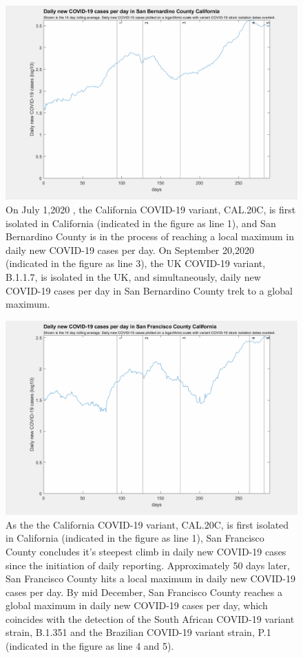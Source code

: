 \documentclass[]{article}
\begin{document}
\begin{figure}[!h]
	\includegraphics[width=\linewidth]{images/san_bernardino_cases_strains_log.png}
	\caption{On July 1,2020 , the California COVID-19 variant, CAL.20C, is first isolated in California (indicated in the figure as line 1), and San Bernardino County is in the process of reaching a local maximum in daily new COVID-19 cases per day. On September 20,2020 (indicated in the figure as line 3), the UK COVID-19 variant, B.1.1.7, is isolated in the UK, and simultaneously, daily new COVID-19 cases per day in San Bernardino County trek to a global maximum. }
	\label{fig:images/san_bernardino_cases_strains_logLabel}
\end{figure}


\begin{figure}[!h]
	\includegraphics[width=\linewidth]{images/san_francisco_cases_strains_log.png}
	\caption{As the the California COVID-19 variant, CAL.20C, is first isolated in California (indicated in the figure as line 1), San Francisco County concludes it's steepest climb in daily new COVID-19 cases since the initiation of daily reporting. Approximately 50 days later, San Francisco County hits a local maximum in daily new COVID-19 cases per day. By mid December, San Francisco County reaches a global maximum in daily new COVID-19 cases per day, which coincides with the detection of the South African COVID-19 variant strain, B.1.351 and the Brazilian COVID-19 variant strain, P.1 (indicated in the figure as line 4 and 5).  }
	\label{fig:images/san_francisco_cases_strains_logLabel}
\end{figure}
\end{document}
